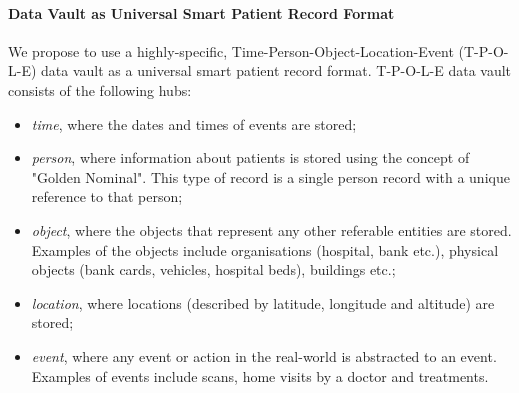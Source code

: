 \paragraph{Data Vault as Universal Smart Patient Record Format} We propose to use a highly-specific, Time-Person-Object-Location-Event (T-P-O-L-E) data vault as a universal smart patient record format. T-P-O-L-E data vault consists of the following hubs:
\begin{itemize}
    \item \emph{time}, where the dates and times of events are stored;
    \item \emph{person}, where  information  about  patients  is  stored  using  the  concept of "Golden Nominal".  This type of record is a single person record with a unique reference to that person;
    \item \emph{object}, where the objects that represent any other referable entities are stored. Examples of the objects include organisations (hospital, bank etc.), physical objects (bank cards, vehicles, hospital beds), buildings etc.; 
    \item \emph{location}, where locations (described by latitude, longitude and altitude) are stored;
    \item \emph{event}, where any event or action in the real-world is abstracted to an event. Examples of events include scans, home visits by a doctor and treatments. 
\end{itemize}








